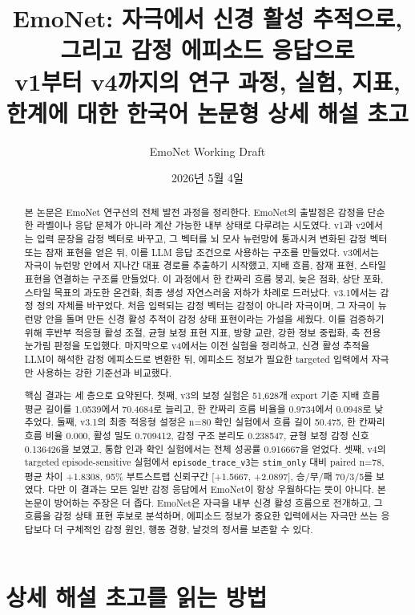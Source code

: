 \documentclass[11pt,a4paper]{article}
\title{\textbf{EmoNet: 자극에서 신경 활성 추적으로, 그리고 감정 에피소드 응답으로}\\
\large v1부터 v4까지의 연구 과정, 실험, 지표, 한계에 대한 한국어 논문형 상세 해설 초고}
\author{EmoNet Working Draft}
\date{2026년 5월 4일}
\newcommand{\eng}[1]{\texttt{#1}}
\begin{document}
\onehalfspacing
\maketitle

\begin{abstract}
본 논문은 EmoNet 연구선의 전체 발전 과정을 정리한다. EmoNet의 출발점은 감정을 단순한 라벨이나 응답 문체가 아니라 계산 가능한 내부 상태로 다루려는 시도였다. v1과 v2에서는 입력 문장을 감정 벡터로 바꾸고, 그 벡터를 뇌 모사 뉴런망에 통과시켜 변화된 감정 벡터 또는 잠재 표현을 얻은 뒤, 이를 LLM 응답 조건으로 사용하는 구조를 만들었다. v3에서는 자극이 뉴런망 안에서 지나간 대표 경로를 추출하기 시작했고, 지배 흐름, 잠재 표현, 스타일 표현을 연결하는 구조를 만들었다. 이 과정에서 한 칸짜리 흐름 붕괴, 늦은 점화, 상단 포화, 스타일 목표의 과도한 온건화, 최종 생성 자연스러움 저하가 차례로 드러났다. v3.1에서는 감정 정의 자체를 바꾸었다. 처음 입력되는 감정 벡터는 감정이 아니라 자극이며, 그 자극이 뉴런망 안을 돌며 만든 신경 활성 추적이 감정 상태 표현이라는 가설을 세웠다. 이를 검증하기 위해 후반부 적응형 활성 조절, 균형 보정 표현 지표, 방향 교란, 강한 정보 중립화, 축 전용 눈가림 판정을 도입했다. 마지막으로 v4에서는 이전 실험을 정리하고, 신경 활성 추적을 LLM이 해석한 감정 에피소드로 변환한 뒤, 에피소드 정보가 필요한 targeted 입력에서 자극만 사용하는 강한 기준선과 비교했다.

핵심 결과는 세 층으로 요약된다. 첫째, v3의 보정 실험은 51,628개 export 기준 지배 흐름 평균 길이를 1.0539에서 70.4684로 늘리고, 한 칸짜리 흐름 비율을 0.9734에서 0.0948로 낮추었다. 둘째, v3.1의 최종 적응형 설정은 n=80 확인 실험에서 흐름 길이 50.475, 한 칸짜리 흐름 비율 0.000, 활성 밀도 0.709412, 감정 구조 분리도 0.238547, 균형 보정 감정 신호 0.136426을 보였고, 통합 인과 확인 실험에서는 전체 성공률 0.916667을 얻었다. 셋째, v4의 targeted episode-sensitive 실험에서 \eng{episode\_trace\_v3}는 \eng{stim\_only} 대비 paired n=78, 평균 차이 +1.8308, 95\% 부트스트랩 신뢰구간 [+1.5667, +2.0897], 승/무/패 70/3/5를 보였다. 다만 이 결과는 모든 일반 감정 응답에서 EmoNet이 항상 우월하다는 뜻이 아니다. 본 논문이 방어하는 주장은 더 좁다. EmoNet은 자극을 내부 신경 활성 흐름으로 전개하고, 그 흐름을 감정 상태 표현 후보로 분석하며, 에피소드 정보가 중요한 입력에서는 자극만 쓰는 응답보다 더 구체적인 감정 원인, 행동 경향, 날것의 정서를 보존할 수 있다.
\end{abstract}

\tableofcontents
\newpage

\section*{상세 해설 초고를 읽는 방법}
\end{document}
